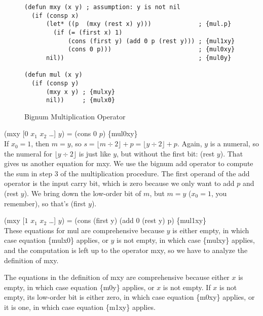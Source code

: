 \begin{figure}
\begin{Verbatim}
(defun mxy (x y) ; assumption: y is not nil
  (if (consp x)
      (let* ((p  (mxy (rest x) y)))             ; {mul.p}
        (if (= (first x) 1)
            (cons (first y) (add 0 p (rest y))) ; {mul1xy}
            (cons 0 p)))                        ; {mul0xy}
      nil))                                     ; {mul0y}

(defun mul (x y)
  (if (consp y)
      (mxy x y) ; {mulxy}
      nil))     ; {mulx0}
\end{Verbatim}
\label{bignum-mul-defun}
\caption{Bignum Multiplication Operator}
\label{fig:bignum-mul-defun}
\end{figure}

\hspace*{2cm} (mxy [$0$ $x_1$ $x_2$ \dots] $y$) = (cons $0$ $p$) \hfill \{mul0xy\}
\\

If $x_0 = 1$, then $m = y$,
so $s = \lfloor m\div 2\rfloor + p = \lfloor y\div 2\rfloor + p$.
Again, $y$ is a numeral, so the numeral for $\lfloor y\div 2\rfloor$
is just like $y$, but without the first bit: (rest $y$).
That gives us another equation for mxy.
We use the bignum add operator to compute the sum in step 3
of the multiplication procedure.
The first operand of the add operator is the input carry bit,
which is zero because we only want to add $p$ and (rest $y$).
We bring down the low-order bit of $m$, but $m = y$
($x_0 = 1$, you remember), so that's (first $y$).

\hspace*{2cm} (mxy [$1$ $x_1$ $x_2$ \dots] $y$) = (cons (first y) (add 0 (rest y) p) \hfill \{mul1xy\}
\\

These equations for mul are comprehensive because $y$ is either empty,
in which case equation \{mulx0\} applies,
or $y$ is not empty, in which case \{mulxy\} applies, and
the computation is left up to the operator mxy,
so we have to analyze the definition of mxy.

The equations in the definition of mxy are comprehensive
because either $x$ is empty, in which case
equation \{m0y\} applies, or $x$ is not empty.
If $x$ is not empty, its low-order bit is either zero,
in which case equation \{m0xy\} applies, or it is one,
in which case equation \{m1xy\} applies.


